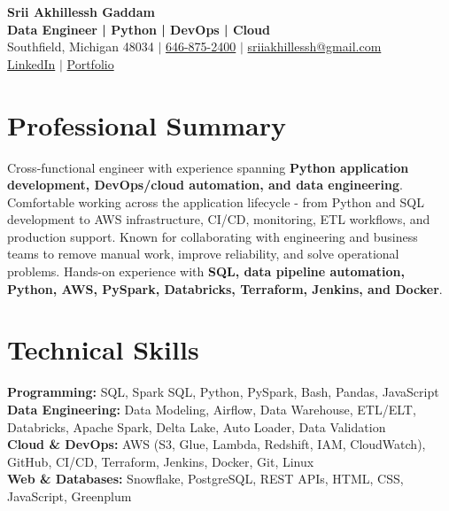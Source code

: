 \documentclass[letterpaper,10pt]{article}
\begin{document}
\fontsize{9.35pt}{10.45pt}\selectfont

\begin{center}
    {\LARGE \textbf{Srii Akhillessh Gaddam}} \\[-1pt]
    \textbf{Data Engineer | Python | DevOps | Cloud} \\[2pt]
    Southfield, Michigan 48034 $|$
    \href{tel:6468752400}{646-875-2400} $|$
    \href{mailto:sriiakhillessh@gmail.com}{sriiakhillessh@gmail.com} \\[1pt]
    \href{https://www.linkedin.com/in/srii-akhiilessh-gaddam-b48668191/}{LinkedIn} $|$
    \href{https://sriiakhillesshg.github.io/portfolio/}{Portfolio}
\end{center}
\vspace{-8pt}

\section{Professional Summary}
\small{Cross-functional engineer with experience spanning \textbf{Python application development, DevOps/cloud automation, and data engineering}. Comfortable working across the application lifecycle - from Python and SQL development to AWS infrastructure, CI/CD, monitoring, ETL workflows, and production support. Known for collaborating with engineering and business teams to remove manual work, improve reliability, and solve operational problems. Hands-on experience with \textbf{SQL, data pipeline automation, Python, AWS, PySpark, Databricks, Terraform, Jenkins, and Docker}.}

\section{Technical Skills}
\small{
\textbf{Programming:} SQL, Spark SQL, Python, PySpark, Bash, Pandas, JavaScript \\
\textbf{Data Engineering:} Data Modeling, Airflow, Data Warehouse, ETL/ELT, Databricks, Apache Spark, Delta Lake, Auto Loader, Data Validation \\
\textbf{Cloud \& DevOps:} AWS (S3, Glue, Lambda, Redshift, IAM, CloudWatch), GitHub, CI/CD, Terraform, Jenkins, Docker, Git, Linux \\
\textbf{Web \& Databases:} Snowflake, PostgreSQL, REST APIs, HTML, CSS, JavaScript, Greenplum
}
\end{document}
